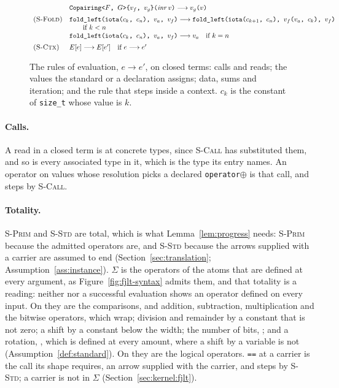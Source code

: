 \begin{figure}[htbp]
\[\begin{array}{ll}
 & \texttt{Copairing<}F\texttt{, }G\texttt{>\{}v_f\texttt{, }v_g\texttt{\}(}\mathit{inr}\,v\texttt{)} \longrightarrow v_g\texttt{(}v\texttt{)} \\[5pt]
\textsc{(S-Fold)} & \texttt{fold\_left(iota(}c_k\texttt{, }c_n\texttt{), }v_a\texttt{, }v_f\texttt{)} \longrightarrow \texttt{fold\_left(iota(}c_{k+1}\texttt{, }c_n\texttt{), }v_f\texttt{(}v_a\texttt{, }c_k\texttt{), }v_f\texttt{)} \\
 & \qquad \text{if } k < n \\
 & \texttt{fold\_left(iota(}c_k\texttt{, }c_n\texttt{), }v_a\texttt{, }v_f\texttt{)} \longrightarrow v_a \quad \text{if } k = n \\[5pt]
\textsc{(S-Ctx)} & E[e] \longrightarrow E[e'] \quad \text{if } e \longrightarrow e' \\
\end{array}
\]
\caption{The rules of evaluation, $e \longrightarrow e'$, on closed terms: calls and reads; the values the standard or a declaration assigns; data, sums and iteration; and the rule that steps inside a context.
$c_k$ is the constant of \texttt{size\_t} whose value is $k$.}
\label{fig:fjlt-eval-calls}
\label{fig:fjlt-eval-standard}
\label{fig:fjlt-eval}
\end{figure}

\paragraph{Calls.}
A read in a closed term is at concrete types, since \textsc{S-Call} has substituted them, and so is every associated type in it, which is the type its entry names.
An operator on values whose resolution picks a declared \texttt{operator}$\oplus$ is that call, and steps by \textsc{S-Call}.

\paragraph{Totality.}
\textsc{S-Prim} and \textsc{S-Std} are total, which is what Lemma~\ref{lem:progress} needs: \textsc{S-Prim} because the admitted operators are, and \textsc{S-Std} because the arrows supplied with a carrier are assumed to end (Section~\ref{sec:translation}; Assumption~\ref{ass:instance}).
$\Sigma$ is the operators of the atoms that are defined at every argument, as Figure~\ref{fig:fjlt-syntax} admits them, and that totality is a reading: neither  nor a successful evaluation shows an operator defined on every input.
On  they are the comparisons, and addition, subtraction, multiplication and the bitwise operators, which wrap; division and remainder by a constant that is not zero; a shift by a constant below the width; the number of bits, ; and a rotation, , which is defined at every amount, where a shift by a variable is not (Assumption~\ref{def:standard}).
On  they are the logical operators.
\texttt{==} at a carrier is the call its shape requires, an arrow supplied with the carrier, and steps by \textsc{S-Std}; a carrier is not in $\Sigma$ (Section~\ref{sec:kernel:fjlt}).

